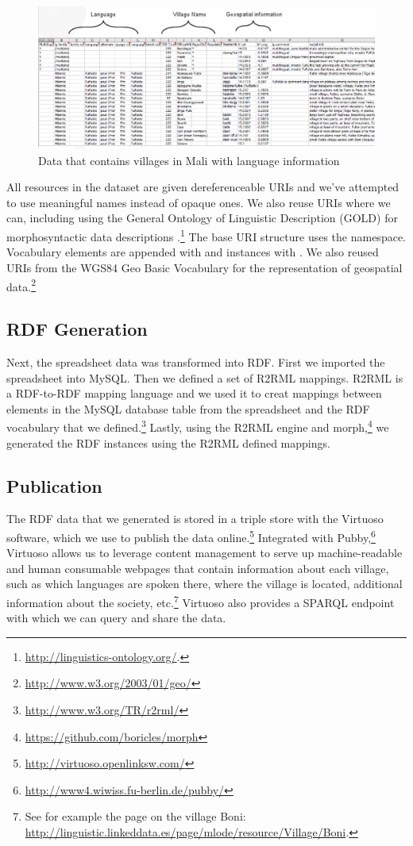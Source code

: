 \begin{figure}[b!hpt]
\caption{Data that contains villages in Mali with language information}\label{spreadsheet}
\includegraphics[width=15cm]{img/spreadsheet.png}
\end{figure}

All resources in the dataset are given dereferenceable URIs and we've attempted to use meaningful names instead of opaque ones. We also reuse URIs where we can, including using the General Ontology of Linguistic Description (GOLD) for morphosyntactic data descriptions \cite{farrar2003linguistic}.\footnote{ \url{http://linguistics-ontology.org/}.} The base URI structure uses the  namespace. Vocabulary elements are appended with  and instances with . We also reused URIs from the WGS84 Geo Basic Vocabulary for the representation of geospatial data.\footnote{\url{http://www.w3.org/2003/01/geo/}} 

\subsection{RDF Generation}
Next, the spreadsheet data was transformed into RDF. First we imported the spreadsheet into MySQL. Then we defined a set of R2RML mappings. R2RML is a RDF-to-RDF mapping language and we used it to creat mappings between elements in the MySQL database table from the spreadsheet and the RDF vocabulary that we defined.\footnote{\url{http://www.w3.org/TR/r2rml/}} Lastly, using the R2RML engine and morph,\footnote{\url{https://github.com/boricles/morph}} we generated the RDF instances using the R2RML defined mappings.

\subsection{Publication}\label{sec:pub}
The RDF data that we generated is stored in a triple store with the Virtuoso software, which we use to publish the data online.\footnote{\url{http://virtuoso.openlinksw.com/}} Integrated with Pubby,\footnote{\url{http://www4.wiwiss.fu-berlin.de/pubby/}} Virtuoso allows us to leverage content management to serve up machine-readable and human consumable webpages that contain information about each village, such as which languages are spoken there, where the village is located, additional information about the society, etc.\footnote{See for example the page on the village Boni: \url{http://linguistic.linkeddata.es/page/mlode/resource/Village/Boni}.} Virtuoso also provides a SPARQL endpoint with which we can query and share the data.

